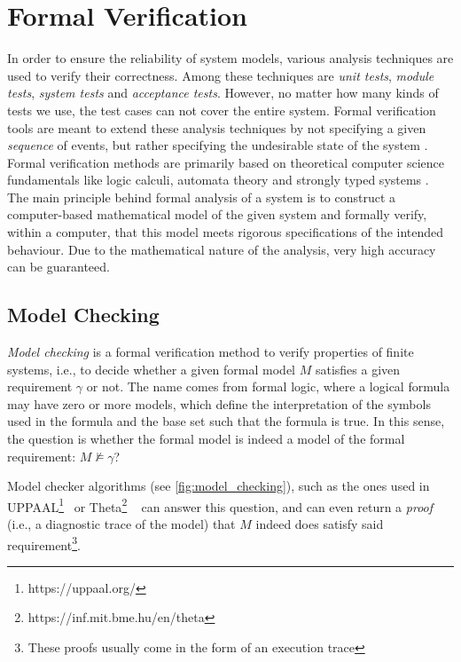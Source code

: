 \section{Formal Verification}\label{sec:formal_verification}

In order to ensure the reliability of system models, various analysis techniques are used to verify their correctness. Among these techniques are \emph{unit tests}, \emph{module tests}, \emph{system tests} and \emph{acceptance tests}. However, no matter how many kinds of tests we use, the test cases can not cover the entire system. Formal verification tools are meant to extend these analysis techniques by not specifying a given \emph{sequence} of events, but rather specifying the undesirable state of the system \cite{10.5555/332656}. Formal verification methods are primarily based on theoretical computer science fundamentals like logic calculi, automata theory and strongly typed systems \cite{en12010019}. The main principle behind formal analysis of a system is to construct a computer-based mathematical model of the given system and formally verify, within a computer, that this model meets rigorous specifications of the intended behaviour. Due to the mathematical nature of the analysis, very high accuracy can be guaranteed.

\subsection{Model Checking}

\emph{Model checking} is a formal verification method to verify properties of finite systems, i.e., to decide whether a given formal model \(M\) satisfies a given requirement \(\gamma\) or not. The name comes from formal logic, where a logical formula may have zero or more models, which define the interpretation of the symbols used in the formula and the base set such that the formula is true. In this sense, the question is whether the formal model is indeed a model of the formal requirement: \(M \not\models \gamma\)?

Model checker algorithms (see \autoref{fig:model_checking}), such as the ones used in UPPAAL\footnote{https://uppaal.org/}~\cite{uppaal} or Theta\footnote{https://inf.mit.bme.hu/en/theta} ~\cite{theta} can answer this question, and can even return a \emph{proof} (i.e., a diagnostic trace of the model) that \(M\) indeed does satisfy said requirement\footnote{These proofs usually come in the form of an execution trace}.

